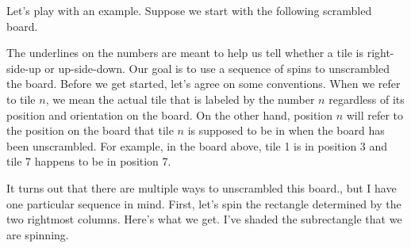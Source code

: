 \begin{example}\label{ex:spinpossible}
Let's play with an example.  Suppose we start with the following scrambled board.

\begin{center}
\end{center}

\noindent The underlines on the numbers are meant to help us tell whether a tile is right-side-up or up-side-down.  Our goal is to use a sequence of spins to unscrambled the board.  Before we get started, let's agree on some conventions.  When we refer to tile \(n\), we mean the actual tile that is labeled by the number \(n\) regardless of its position and orientation on the board.  On the other hand, position \(n\) will refer to the position on the board that tile \(n\) is supposed to be in when the board has been unscrambled.  For example, in the board above, tile 1 is in position 3 and tile 7 happens to be in position 7.  

It turns out that there are multiple ways to unscrambled this board., but I have one particular sequence in mind.  First, let's spin the rectangle determined by the two rightmost columns.  Here's what we get.  I've shaded the subrectangle that we are spinning.


\end{example}
